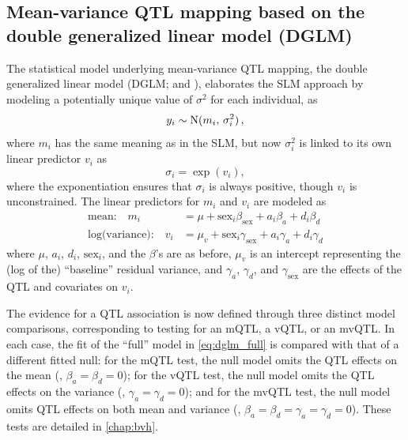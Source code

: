 \subsection{Mean-variance QTL mapping based on the double generalized linear model (DGLM)}

    The statistical model underlying mean-variance QTL mapping, the double generalized linear model (DGLM; \citealt{Smyth1989} and \citealt{Ronnegard2011a}), elaborates the SLM approach by modeling a potentially unique value of $\sigma^2$ for each individual, as
    \[
        y_i \sim \mathrm{N}(m_i, \,\sigma_i^2)\,,
    \]
    where $m_i$ has the same meaning as in the SLM, but now $\sigma^2_i$ is linked to its own linear predictor $v_i$ as
    \[
        \sigma_i = \exp(v_i),
    \]
    where the exponentiation ensures that $\sigma_i$ is always positive, though $v_i$ is unconstrained.
    The linear predictors for $m_i$ and $v_i$ are modeled as
    \begin{equation}\label{eq:dglm_full}
    \begin{aligned}
        \text{mean:~~~} m_i &= \mu + \text{sex}_i\beta_\text{sex} + a_i\beta_a + d_i\beta_d\\
        \text{log(variance):~~~} v_i &=  \mu_v + \text{sex}_i\gamma_\text{sex} + a_i\gamma_a + d_i\gamma_d
    \end{aligned}
    \end{equation}
    where $\mu$, $a_i$, $d_i$, $\text{sex}_i$, and the $\beta$'s are as before,
    $\mu_v$ is an intercept representing the (log of the) ``baseline'' residual variance, and $\gamma_a$, $\gamma_d$, and $\gamma_\text{sex}$ are the effects of the QTL and covariates on $v_i$.

    The evidence for a QTL association is now defined through three distinct model comparisons, corresponding to testing for an mQTL, a vQTL, or an mvQTL.
    In each case, the fit of the ``full'' model in \autoref{eq:dglm_full} is compared with that of a different fitted null: for the mQTL test, the null model omits the QTL effects on the mean (\ie, $\beta_a=\beta_d=0$); for the vQTL test, the null model omits the QTL effects on the variance (\ie, $\gamma_a=\gamma_d=0$); and for the mvQTL test, the null model omits QTL effects on both mean and variance (\ie, $\beta_a=\beta_d=\gamma_a=\gamma_d=0$).
    These tests are detailed in \autoref{chap:bvh}.


